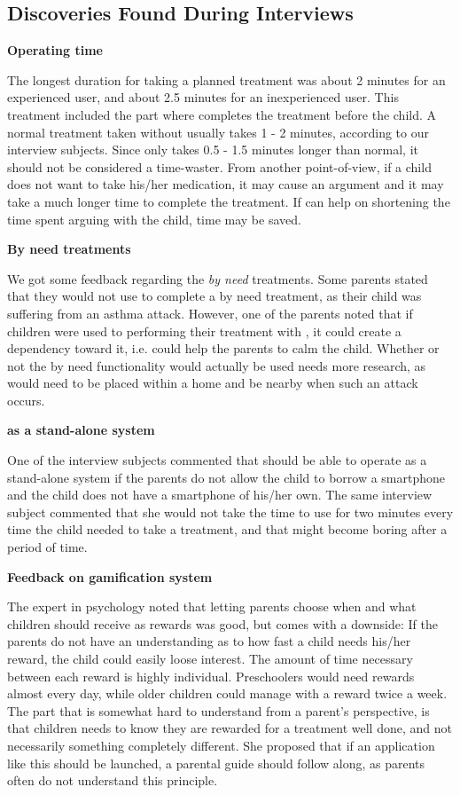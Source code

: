 \subsection{Discoveries Found During Interviews}

\textbf{Operating time}

The longest duration for taking a planned treatment was about 2 minutes for an experienced user, and about 2.5 minutes for an inexperienced user. This treatment included the part where \buddy{} completes the treatment before the child. A normal treatment taken without \ab{} usually takes 1 - 2 minutes, according to our interview subjects. Since \ab{} only takes 0.5 - 1.5 minutes longer than normal, it should not be considered a time-waster. From another point-of-view, if a child does not want to take his/her medication, it may cause an argument and it may take a much longer time to complete the treatment. If \ab{} can help on shortening the time spent arguing with the child, time may be saved.      

\clearpage{}
\textbf{By need treatments}

We got some feedback regarding the \emph{by need} treatments. Some parents stated that they would not use \buddy{} to complete a by need treatment, as their child was suffering from an asthma attack. However, one of the parents noted that if children were used to performing their treatment with \buddy{}, it could create a dependency toward it, i.e. \buddy{} could help the parents to calm the child. Whether or not the by need functionality would actually be used needs more research, as \buddy{} would need to be placed within a home and be nearby when such an attack occurs. 

\textbf{\ab{} as a stand-alone system}

One of the interview subjects commented that \ab{} should be able to operate as a stand-alone system if the parents do not allow the child to borrow a smartphone and the child does not have a smartphone of his/her own. The same interview subject commented that she would not take the time to use \ab{} for two minutes every time the child needed to take a treatment, and that \ab{} might become boring after a period of time.

\textbf{Feedback on gamification system}

The expert in psychology noted that letting parents choose when and what children should receive as rewards was good, but comes with a downside: If the parents do not have an understanding as to how fast a child needs his/her reward, the child could easily loose interest. The amount of time necessary between each reward is highly individual. Preschoolers would need rewards almost every day, while older children could manage with a reward twice a week. The part that is somewhat hard to understand from a parent's perspective, is that children needs to know they are rewarded for a treatment well done, and not necessarily something completely different. She proposed that if an application like this should be launched, a parental guide should follow along, as parents often do not understand this principle.

